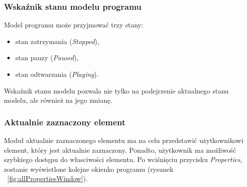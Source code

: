 \documentclass[12pt]{article}
\begin{document}
\subsubsection{Wskaźnik stanu modelu programu}
Model programu może przyjmować trzy stany:
\begin{itemize}
\item stan zatrzymania (\textit{Stopped}),
\item stan pauzy (\textit{Paused}),
\item stan odtwarzania (\textit{Playing}).
\end{itemize}
Wskaźnik stanu modelu pozwala nie tylko na podejrzenie aktualnego stanu modelu, ale również na jego zmianę.
\subsubsection{Aktualnie zaznaczony element}
Moduł aktualnie zaznaczonego elementu ma na celu przedstawić użytkownikowi element, który jest aktualnie zaznaczony. Ponadto, użytkownik ma możliwość szybkiego dostępu do własciwości elementu. Po wciśnięciu przycisku \textit{Properties}, zostanie wyświetlone kolejne okienko programu (rysunek ~\ref{fig:allPropertiesWindow}).
\end{document}
